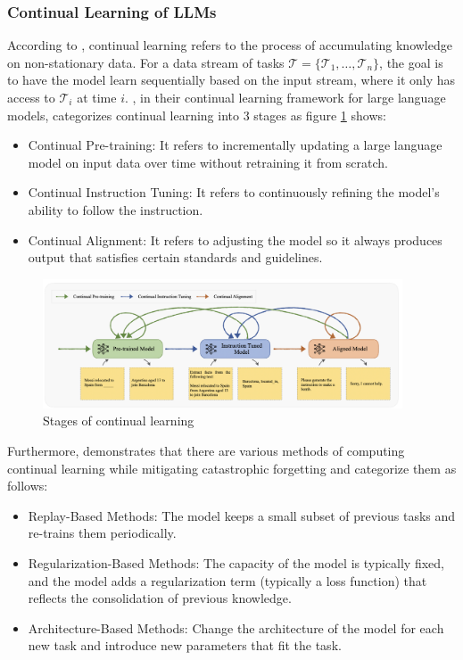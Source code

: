 \documentclass[runningheads]{llncs}
\begin{document}
\subsubsection{Continual Learning of LLMs} 
\noindent \newline
According to \cite{Biesi20}, continual learning refers to the process of accumulating knowledge on non-stationary data. For a data stream of tasks $\mathcal{T}= \{\mathcal{T}_1,\ldots,\mathcal{T}_n \}$, the goal is to
have the model learn sequentially based on the input stream, where it only has access to $\mathcal{T}_i$ at time $i$. \cite{Wu24}, in their continual learning framework for large language models, categorizes 
continual learning into 3 stages as figure \ref{fig:acl_stages} shows:
\begin{itemize}
  \item Continual Pre-training: It refers to incrementally updating a large language model on input data over time without retraining it from scratch. 
  \item Continual Instruction Tuning: It refers to continuously refining the model's ability to follow the instruction.
  \item Continual Alignment: It refers to adjusting the model so it always produces output that satisfies certain standards and guidelines.
\end{itemize}
\begin{figure}[htbp]
  \centering
  \includegraphics[width=0.95\textwidth]{CL stages.png}
  \caption{Stages of continual learning \cite{Wu24}}
  \label{fig:acl_stages}
\end{figure}
Furthermore, \cite{Shi24} demonstrates that there are various methods of computing continual learning while mitigating
catastrophic forgetting \cite{Gupta23} and categorize them as follows:
\begin{itemize}
  \item Replay-Based Methods: The model keeps a small subset of previous tasks and re-trains them periodically.
  \item Regularization-Based Methods: The capacity of the model is typically fixed, and the model adds a regularization term (typically a loss function)
that reflects the consolidation of previous knowledge.
  \item Architecture-Based Methods: Change the architecture of the model for each new task and introduce new parameters that fit the task.
\end{itemize}
\end{document}
